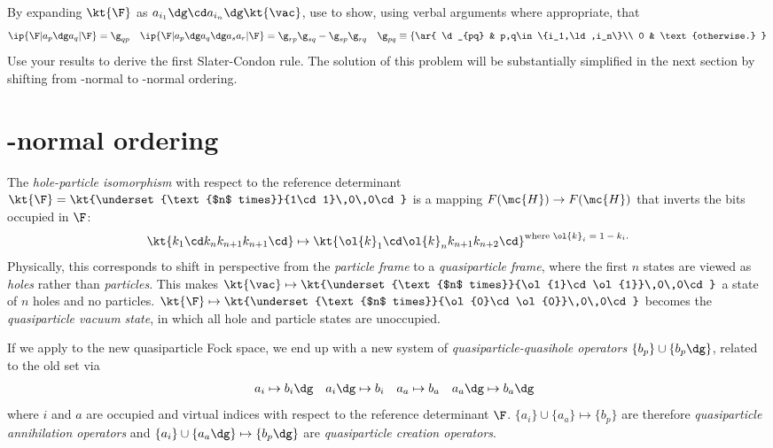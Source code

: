 \documentclass[11pt,fleqn]{article}
\numberwithin{equation}{section}
\begin{document}
\begin{prob}\label{slater-rule-1}
By expanding $\kt{\F}$ as $a_{i_1}\dg\cd a_{i_n}\dg\kt{\vac}$, use  to show, using verbal arguments where appropriate, that
\begin{align*}
  \ip{\F|a_p\dg a_q|\F}
=
  \g_{qp}
&&
  \ip{\F|a_p\dg a_q\dg a_sa_r|\F}
=
  \g_{rp}\g_{sq}
-
  \g_{sp}\g_{rq}
&&
  \g_{pq}
\equiv
  \left\{\ar{
    \d_{pq} & p,q\in\{i_1,\ld,i_n\}\\
    0       & \text{otherwise.}
  }\right.
\end{align*}
Use your results to derive the first Slater-Condon rule.
The solution of this problem will be substantially simplified in the next section by shifting from \vac-normal to \F-normal ordering.
\end{prob}


\section{\F-normal ordering}

\begin{dfn} \label{hole-particle-isomorphism}
The \textit{hole-particle isomorphism} with respect to the reference determinant $\kt{\F}=\kt{\underset{\text{$n$ times}}{1\cd1}\,0\,0\cd}$ is a mapping $F(\mc{H})\rightarrow F(\mc{H})$ that inverts the bits occupied in $\F$:
\begin{align*}
  \kt{k_1\cd k_nk_{n+1}k_{n+1}\cd}
\mapsto
  \kt{\ol{k}_1\cd \ol{k}_nk_{n+1}k_{n+2}\cd}
\sp
  \text{where $\ol{k}_i=1-k_i$.}
\end{align*}
Physically, this corresponds to shift in perspective from the \textit{particle frame} to a \textit{quasiparticle frame}, where the first $n$ states are viewed as \textit{holes} rather than \textit{particles}.
This makes $\kt{\vac}\mapsto\kt{\underset{\text{$n$ times}}{\ol{1}\cd\ol{1}}\,0\,0\cd}$ a state of $n$ holes and no particles.  $\kt{\F}\mapsto\kt{\underset{\text{$n$ times}}{\ol{0}\cd\ol{0}}\,0\,0\cd}$ becomes the \textit{quasiparticle vacuum state}, in which all hole and particle states are unoccupied.
\end{dfn}

\begin{dfn}
If we apply  to the new quasiparticle Fock space, we end up with a new system of \textit{quasiparticle-quasihole operators} $\{b_p\}\cup\{b_p\dg\}$, related to the old set via
\begin{align}
&&
  a_i
\mapsto
  b_i\dg
&&
  a_i\dg
\mapsto
  b_i
&&
  a_a
\mapsto
  b_a
&&
  a_a\dg
\mapsto
  b_a\dg
\end{align}
where $i$ and $a$ are occupied and virtual indices with respect to the reference determinant $\F$.
$\{a_i\}\cup\{a_a\}\mapsto\{b_p\}$ are therefore \textit{quasiparticle annihilation operators} and $\{a_i\}\cup\{a_a\dg\}\mapsto\{b_p\dg\}$ are \textit{quasiparticle creation operators}.
\end{dfn}
\end{document}
